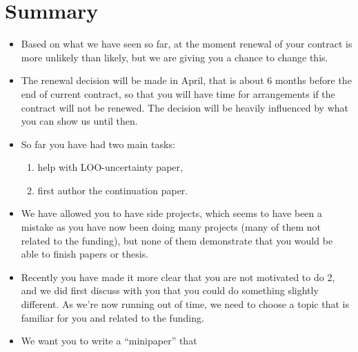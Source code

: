 \hypertarget{summary}{%
\section{Summary}\label{summary}}

\begin{itemize}
\tightlist
\item
  Based on what we have seen so far, at the moment renewal of your
  contract is more unlikely than likely, but we are giving you a chance
  to change this.
\item
  The renewal decision will be made in April, that is about 6 months
  before the end of current contract, so that you will have time for
  arrangements if the contract will not be renewed. The decision will be
  heavily influenced by what you can show us until then.
\item
  So far you have had two main tasks:

  \begin{enumerate}
  \def\labelenumi{\arabic{enumi})}
  \tightlist
  \item
    help with LOO-uncertainty paper,
  \item
    first author the continuation paper.
  \end{enumerate}
\item
  We have allowed you to have side projects, which seems to have been a
  mistake as you have now been doing many projects (many of them not
  related to the funding), but none of them demonstrate that you would
  be able to finish papers or thesis.
\item
  Recently you have made it more clear that you are not motivated to do
  2, and we did first discuss with you that you could do something
  slightly different. As we're now running out of time, we need to
  choose a topic that is familiar for you and related to the funding.
\item
  We want you to write a ``minipaper'' that


\end{itemize}
